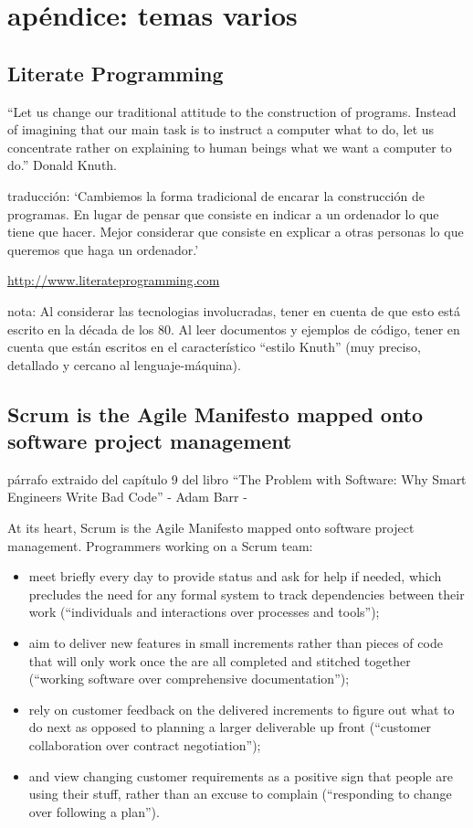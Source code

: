 \documentclass[spanish,12pt,a4paper,final,oneside]{book}
\begin{document}
\chapter*{apéndice: temas varios}

\section*{Literate Programming}
``Let us change our traditional attitude to the construction of programs. Instead of imagining that our main task is to instruct a computer what to do, let us concentrate rather on explaining to human beings what we want a computer to do.''
Donald Knuth.

traducción: ‘Cambiemos la forma tradicional de encarar la construcción de programas. En lugar de pensar que consiste en indicar a un ordenador lo que tiene que hacer. Mejor considerar que consiste en explicar a otras personas lo que queremos que haga un ordenador.’

\url{http://www.literateprogramming.com} 

nota: Al considerar las tecnologias involucradas, tener en cuenta de que esto está escrito en la década de los 80. Al leer documentos y ejemplos de código, tener en cuenta que están escritos en el característico ``estilo Knuth'' (muy preciso, detallado y cercano al lenguaje-máquina).

\section*{Scrum is the Agile Manifesto mapped onto software project management}
párrafo extraido del capítulo 9 del libro ``The Problem with Software: Why Smart Engineers Write Bad Code'' - Adam Barr - 

At its heart, Scrum is the Agile Manifesto mapped onto software project management. Programmers working on a Scrum team:
\begin{itemize}
\item meet briefly every day to provide status and ask for help if needed, which precludes the need for any formal system to track dependencies between their work (``individuals and interactions over processes and tools''); 
\item aim to deliver new features in small increments rather than pieces of code that will only work once the are all completed and stitched together (``working software over comprehensive documentation''); 
\item rely on customer feedback on the delivered increments to figure out what to do next as opposed to planning a larger deliverable up front (``customer collaboration over contract negotiation''); 
\item and view changing customer requirements as a positive sign that people are using their stuff, rather than an excuse to complain (``responding to change over following a plan'').
\end{itemize}
\end{document}
